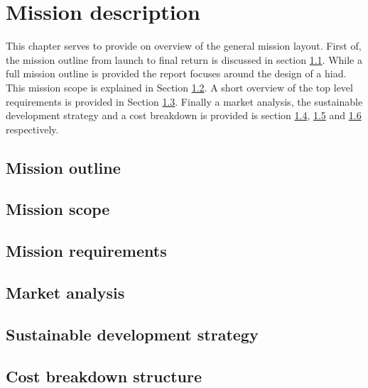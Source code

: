\section{Mission description}\label{cha:missiondescr}

This chapter serves to provide on overview of the general mission layout. First of, the mission outline from launch to final return is discussed in section \ref{sec:missionoutline}. While a full mission outline is provided the report focuses around the design of a \gls{hiad}. This mission scope is explained in Section \ref{sec:missionscope}. A short overview of the top level requirements is provided in Section \ref{sec:missionreq}. Finally a market analysis, the sustainable development strategy and a cost breakdown is provided is section \ref{sec:marketanalysis}, \ref{sec:sustainable} and \ref{sec:costbreakdown} respectively. 

\subsection{Mission outline} \label{sec:missionoutline}


\subsection{Mission scope} \label{sec:missionscope}


\subsection{Mission requirements} \label{sec:missionreq}


\subsection{Market analysis} \label{sec:marketanalysis}


\subsection{Sustainable development strategy} \label{sec:sustainable}


\subsection{Cost breakdown structure} \label{sec:costbreakdown}


%

